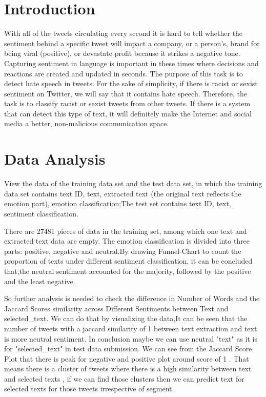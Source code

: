 \section{Introduction}\label{sec-intro}

\begin{JournalOnly}
\end{JournalOnly}
With all of the tweets circulating every second it is hard to tell whether the sentiment behind a specific tweet will impact a company,
or a person's, brand for being viral (positive),
or devastate profit because it strikes a negative tone.
Capturing sentiment in language is important in these times where decisions and reactions are created and updated in seconds.
The purpose of this task is to detect hate speech in tweets. For the sake of simplicity, if there is racist or sexist sentiment on Twitter, we will say that it contains hate speech. Therefore, the task is to classify racist or sexist tweets from other tweets.
If there is a system that can detect this type of text, it will definitely make the Internet and social media a better, non-malicious communication space.


\section{Data Analysis} \label{sec-experiment}
View the data of the training data set and the test data set, 
in which the training data set contains text ID, text, 
extracted text (the original text reflects the emotion part), 
emotion classification;The test set contains text ID, text, sentiment classification.

There are 27481 pieces of data in the training set, 
among which one text and extracted text data are empty. 
The emotion classification is divided into three parts: positive, 
negative and neutral.By drawing Funnel-Chart to count the proportion of texts under different sentiment classification, 
it can be concluded that,the neutral sentiment accounted for the majority, 
followed by the positive and the least negative.

So further analysis is needed to check the difference in Number of Words and the Jaccard Scores similarity across Different Sentiments between Text and selected_text.
We can do that by visualizing the data,It can be seen that the number of tweets with a jaccard similarity of 1 between text extraction and text is more neutral sentiment.
In conclusion maybe we can use neutral "text" as it is for "selected_text" in test data submission.
We can see from the Jaccard Score Plot that there is peak for negative and positive plot around score of 1 .
That means there is a cluster of tweets where there is a high similarity between text and selected texts ,
if we can find those clusters then we can predict text for selected texts for those tweets irrespective of segment.


